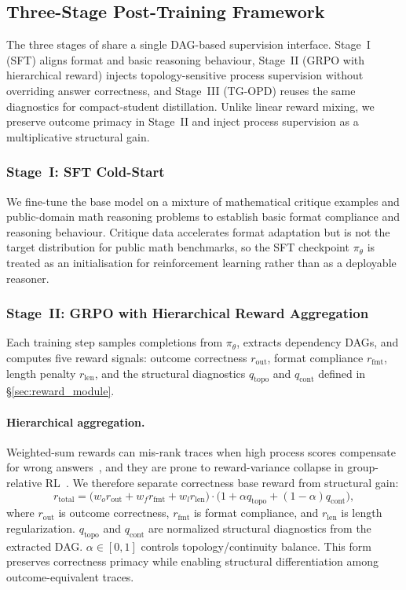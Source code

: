 \subsection{Three-Stage Post-Training Framework}
\label{sec:post_training}
The three stages of \framework share a single DAG-based supervision interface.
Stage~I (SFT) aligns format and basic reasoning behaviour, Stage~II (GRPO with hierarchical reward) injects topology-sensitive process supervision without overriding answer correctness, and Stage~III (TG-OPD) reuses the same diagnostics for compact-student distillation.
Unlike linear reward mixing, we preserve outcome primacy in Stage~II and inject process supervision as a multiplicative structural gain.

\subsubsection{Stage~I: SFT Cold-Start}

We fine-tune the base model on a mixture of mathematical critique examples and public-domain math reasoning problems to establish basic format compliance and reasoning behaviour.
Critique data accelerates format adaptation but is not the target distribution for public math benchmarks, so the SFT checkpoint $\pi_\theta$ is treated as an initialisation for reinforcement learning rather than as a deployable reasoner.

\subsubsection{Stage~II: GRPO with Hierarchical Reward Aggregation}

Each training step samples completions from $\pi_\theta$, extracts dependency DAGs, and computes five reward signals: outcome correctness $r_{\mathrm{out}}$, format compliance $r_{\mathrm{fmt}}$, length penalty $r_{\mathrm{len}}$, and the structural diagnostics $q_{\mathrm{topo}}$ and $q_{\mathrm{cont}}$ defined in \S\ref{sec:reward_module}.

\paragraph{Hierarchical aggregation.}
Weighted-sum rewards can mis-rank traces when high process scores compensate for wrong answers~\citep{Denison2024SycophancyTS}, and they are prone to reward-variance collapse in group-relative RL~\citep{yu2025dapo,kazemnejad2025vineppo}.
We therefore separate correctness base reward from structural gain:
\begin{equation}
\label{eq:r_total}
r_{\mathrm{total}} =
\bigl(w_o r_{\mathrm{out}} + w_f r_{\mathrm{fmt}} + w_l r_{\mathrm{len}}\bigr)
\cdot
\bigl(1 + \alpha q_{\mathrm{topo}} + (1-\alpha) q_{\mathrm{cont}}\bigr),
\end{equation}
where $r_{\mathrm{out}}$ is outcome correctness, $r_{\mathrm{fmt}}$ is format compliance, and $r_{\mathrm{len}}$ is length regularization.
$q_{\mathrm{topo}}$ and $q_{\mathrm{cont}}$ are normalized structural diagnostics from the extracted DAG.
$\alpha\in[0,1]$ controls topology/continuity balance.
This form preserves correctness primacy while enabling structural differentiation among outcome-equivalent traces.

